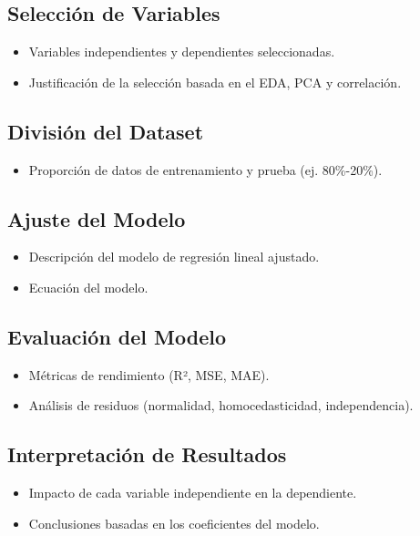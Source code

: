 \documentclass{article}
\begin{document}
\subsection{Selección de Variables}
\begin{itemize}
    \item Variables independientes y dependientes seleccionadas.
    \item Justificación de la selección basada en el EDA, PCA y correlación.
\end{itemize}

\subsection{División del Dataset}
\begin{itemize}
    \item Proporción de datos de entrenamiento y prueba (ej. 80\%-20\%).
\end{itemize}

\subsection{Ajuste del Modelo}
\begin{itemize}
    \item Descripción del modelo de regresión lineal ajustado.
    \item Ecuación del modelo.
\end{itemize}

\subsection{Evaluación del Modelo}
\begin{itemize}
    \item Métricas de rendimiento (R², MSE, MAE).
    \item Análisis de residuos (normalidad, homocedasticidad, independencia).
\end{itemize}

\subsection{Interpretación de Resultados}
\begin{itemize}
    \item Impacto de cada variable independiente en la dependiente.
    \item Conclusiones basadas en los coeficientes del modelo.
\end{itemize}
\end{document}
